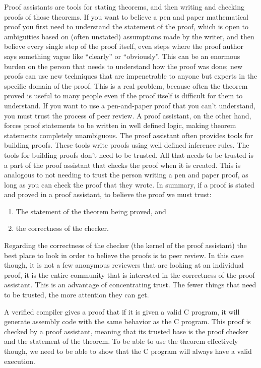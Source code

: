 \documentclass{puthesis}
\begin{document}
Proof assistants are tools for stating theorems, and then writing and
checking proofs of those theorems. If you want to believe a pen and
paper mathematical proof you first need to understand the statement of
the proof, which is open to ambiguities based on (often unstated)
assumptions made by the writer, and then believe every single step of
the proof itself, even steps where the proof author says something
vague like ``clearly'' or ``obviously''. This can be an enormous
burden on the person that needs to understand how the proof was done;
new proofs can use new techniques that are impenetrable to anyone but
experts in the specific domain of the proof. This is a real problem,
because often the theorem proved is useful to many people even if the
proof itself is difficult for them to understand. If you want to use a
pen-and-paper proof that you can't understand, you must trust the
process of peer review. 
A proof assistant, on the other hand, forces proof statements to be
written in well defined logic, making theorem statements completely
unambiguous. The proof assistant often provides tools for building
proofs. These tools write proofs using well defined inference rules.
The tools for building proofs don't need to be
trusted. All that needs to be trusted is a part of the proof assistant
that checks the proof when it is created. This is analogous to not
needing to trust the person writing a pen and paper proof, as long as
you can check the proof that they wrote. In summary, if a proof is
stated and proved in a proof assistant, to believe the proof we must
trust:

\begin{enumerate}
  \item The statement of the theorem being proved, and
  \item the correctness of the checker. 
\end{enumerate}

Regarding the correctness of the checker (the kernel of the proof
assistant) the best place to look in order to believe the proofs is to
peer review. In this case though, it is not a few anonymous reviewers
that are looking at an individual proof, it is the entire community
that is interested in the correctness of the proof assistant. This is
an advantage of concentrating trust. The fewer things that need to be
trusted, the more attention they can get.


A verified compiler gives a proof that if it is given a valid C
program, it will generate assembly code with the same behavior as the
C program. This proof is checked by a proof assistant, meaning that
its trusted base is the proof checker and the statement of the
theorem. To be able to use the theorem effectively though, we need to
be able to show that the C program will always have a valid execution.
\end{document}
